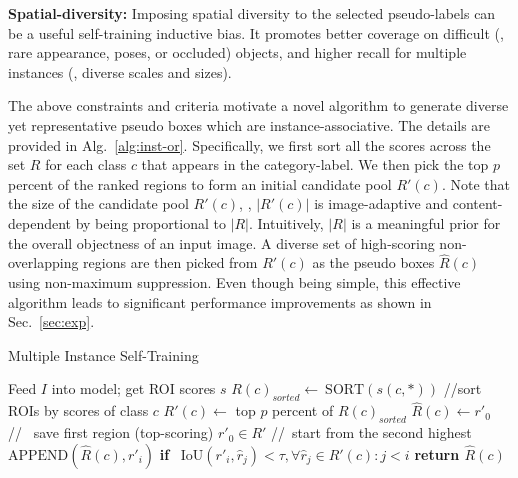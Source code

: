 \documentclass[10pt,twocolumn,letterpaper]{article}
\begin{document}
\noindent\textbf{Spatial-diversity:} Imposing spatial diversity to the selected pseudo-labels can be a useful self-training inductive bias. It promotes better coverage on difficult (\eg, rare appearance, poses, or occluded) objects, and higher recall for multiple instances (\eg, diverse scales and sizes).

The above constraints and criteria motivate  a novel algorithm  to generate diverse yet representative pseudo boxes which are  instance-associative. The details are provided in Alg.~\ref{alg:inst-or}. Specifically, we first sort all the scores across the set $R$ for each class $c$ that appears in the category-label. We then pick the top $p$ percent of the ranked regions to form an initial candidate pool $R'(c)$. Note that the size of the candidate pool $R'(c)$, \ie, $|R'(c)|$ is image-adaptive and content-dependent by being proportional to $|R|$. Intuitively, $|R|$ is a meaningful prior for the overall objectness of an input image. A diverse set of high-scoring non-overlapping regions are then picked from $R'(c)$ as the pseudo boxes $\hat R(c)$ using non-maximum suppression. Even though being simple, this effective algorithm leads to significant performance improvements as shown in Sec.~\ref{sec:exp}. 

\begin{algorithm}[t]
\footnotesize
\caption{Multiple Instance Self-Training}
\begin{algorithmic}[1]
        \State Feed $I$ into model; get ROI scores $s$
            \State $R(c)_{sorted} \leftarrow ~\text{SORT}(s(c, *)) $  \hfill//sort ROIs by scores of class $c$
            \State $R'(c) \leftarrow $  top $p$ percent of $R(c)_{sorted}$
            \State  $\hat{R}(c) \leftarrow r'_0 $    \hfill//~ save first region (top-scoring) $ r'_0 \in R'$
               \hfill//~start from the second highest
                \State $\text{APPEND}(\hat R(c), r'_i)$ \textbf{if}~ $\text{IoU}(r'_i, \hat r_j) < \tau, \forall \hat r_j \in R' (c): j < i$ 
            \EndFor
        \EndFor
        \State \textbf{return  $\hat{R}(c)$}
\end{algorithmic}
\label{alg:inst-or}
\end{algorithm}

\vspace{-1em}
\end{document}
